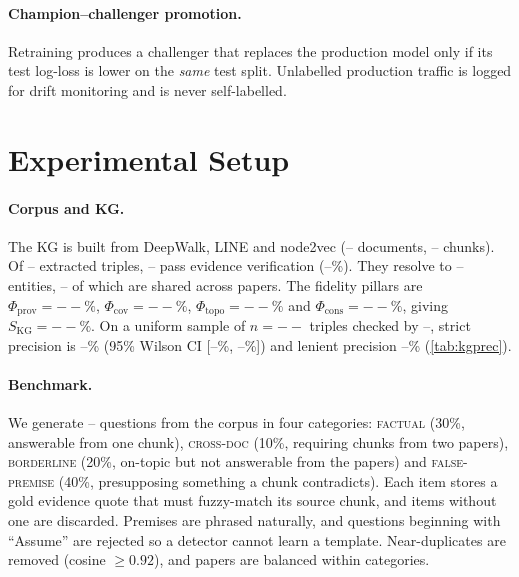 \documentclass[10pt,twocolumn]{article}
\theoremstyle{remark}
\newcommand{\SKG}{--}\newcommand{\PhiProv}{--}\newcommand{\PhiCov}{--}\newcommand{\PhiTopo}{--}\newcommand{\PhiCons}{--}
\newcommand{\NDocs}{--}\newcommand{\NChunks}{--}\newcommand{\NRawTriples}{--}\newcommand{\NTriples}{--}
\newcommand{\NEntities}{--}\newcommand{\NShared}{--}\newcommand{\AcceptRate}{--}\newcommand{\NItems}{--}
\newcommand{\KGPrec}{--}\newcommand{\KGPrecLo}{--}\newcommand{\KGPrecHi}{--}\newcommand{\KGPrecLenient}{--}
\newcommand{\KGAuditN}{--}\newcommand{\KGAuditor}{--}\newcommand{\ExtentHal}{--}\newcommand{\ExtentSup}{--}\newcommand{\ExtentAUC}{--}
\begin{document}
\paragraph{Champion--challenger promotion.}
Retraining produces a challenger that replaces the production model only if its test log-loss is lower on the
\emph{same} test split. Unlabelled production traffic is logged for drift monitoring and is never self-labelled.

\section{Experimental Setup}
\label{sec:setup}

\paragraph{Corpus and KG.}
The KG is built from DeepWalk, LINE and node2vec (\NDocs{} documents, \NChunks{} chunks). Of \NRawTriples{} extracted
triples, \NTriples{} pass evidence verification (\AcceptRate\%). They resolve to \NEntities{} entities, \NShared{} of
which are shared across papers. The fidelity pillars are $\Phi_{\mathrm{prov}}=\PhiProv\%$,
$\Phi_{\mathrm{cov}}=\PhiCov\%$, $\Phi_{\mathrm{topo}}=\PhiTopo\%$ and $\Phi_{\mathrm{cons}}=\PhiCons\%$, giving
$S_{\mathrm{KG}}=\SKG\%$. On a uniform sample of $n=\KGAuditN$ triples checked by \KGAuditor, strict precision is
\KGPrec\% (95\% Wilson CI [\KGPrecLo\%, \KGPrecHi\%]) and lenient precision \KGPrecLenient\% (\cref{tab:kgprec}).

\paragraph{Benchmark.}
We generate \NItems{} questions from the corpus in four categories: \textsc{factual} (30\%, answerable from one
chunk), \textsc{cross-doc} (10\%, requiring chunks from two papers), \textsc{borderline} (20\%, on-topic but not
answerable from the papers) and \textsc{false-premise} (40\%, presupposing something a chunk contradicts). Each item
stores a gold evidence quote that must fuzzy-match its source chunk, and items without one are discarded. Premises are
phrased naturally, and questions beginning with ``Assume'' are rejected so a detector cannot learn a template.
Near-duplicates are removed (cosine $\ge0.92$), and papers are balanced within categories.
\end{document}
